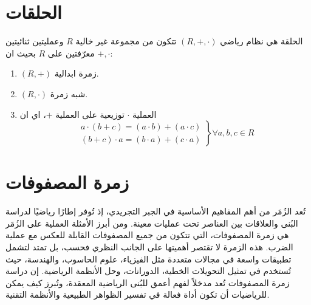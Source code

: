 \section{الحلقات}
\begin{definition}
	الحلقة هي نظام رياضي $(R, +, \cdot)$ تتكون من مجموعة غير خالية $R$ وعمليتين ثنائيتين $+, \cdot$ معرّفتين على $R$ بحيث ان:
	\begin{enumerate}
		\item $(R, +)$ زمرة ابدالية.
		\item $(R, \cdot)$ شبه زمرة.
		\item العملية $\cdot$ توزيعية على العملية $+$، اي ان
		\[\left.
		\begin{array}{c}
			a\cdot(b+c) = (a\cdot b) + (a\cdot c)\\
			(b+c)\cdot a=(b\cdot a)+(c\cdot a)
		\end{array}\right\} \forall a,b,c\in R
		\] 
	\end{enumerate}
\end{definition}

\section{زمرة المصفوفات}
تُعد الزُمَر من أهم المفاهيم الأساسية في الجبر التجريدي، إذ تُوفر إطارًا رياضيًا لدراسة البُنى والعلاقات بين العناصر تحت عمليات معينة. ومن أبرز الأمثلة العملية على الزُمَر هي زمرة المصفوفات، التي تتكون من جميع المصفوفات القابلة للعكس مع عملية الضرب. هذه الزمرة لا تقتصر أهميتها على الجانب النظري فحسب، بل تمتد لتشمل تطبيقات واسعة في مجالات متعددة مثل الفيزياء، علوم الحاسوب، والهندسة، حيث تُستخدم في تمثيل التحويلات الخطية، الدورانات، وحل الأنظمة الرياضية. إن دراسة زمرة المصفوفات تُعد مدخلاً لفهم أعمق للبُنى الرياضية المعقدة، وتُبرز كيف يمكن للرياضيات أن تكون أداة فعالة في تفسير الظواهر الطبيعية والأنظمة التقنية.



